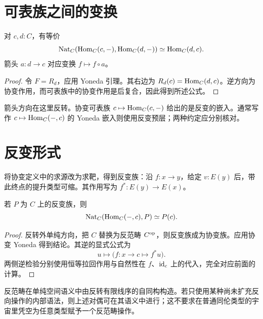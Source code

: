 \section{可表族之间的变换}
\begin{proposition}[协变可表的全忠实形式]\label{prop:covariant-yoneda-ff}
对 $c,d:C$，有等价
\[
\operatorname{Nat}_C(\operatorname{Hom}_C(c,-),\operatorname{Hom}_C(d,-))
\simeq\operatorname{Hom}_C(d,c).
\]
箭头 $a:d\to c$ 对应变换 $f\mapsto f\circ a$。
\end{proposition}
\begin{proof}
令 $F=R_d$，应用 Yoneda 引理。其右边为 $R_d(c)=\operatorname{Hom}_C(d,c)$。逆方向为协变作用，而可表族中的协变作用是后复合，因此得到所述公式。
\end{proof}
\begin{remark}
箭头方向在这里反转。协变可表族 $c\mapsto\operatorname{Hom}_C(c,-)$ 给出的是反变的嵌入。通常写作 $c\mapsto\operatorname{Hom}_C(-,c)$ 的 Yoneda 嵌入则使用反变预层；两种约定应分别核对。
\end{remark}

\section{反变形式}
\begin{definition}[反变族]
将协变定义中的求源改为求靶，得到反变族：沿 $f:x\to y$，给定 $v:E(y)$ 后，带此终点的提升类型可缩。其作用写为 $f^*:E(y)\to E(x)$。
\end{definition}
\begin{theorem}[反变 Yoneda 引理]
若 $P$ 为 $C$ 上的反变族，则
\[
\operatorname{Nat}_C(\operatorname{Hom}_C(-,c),P)\simeq P(c).
\]
\end{theorem}
\begin{proof}
反转外单纯方向，把 $C$ 替换为反范畴 $C^{\mathrm{op}}$，则反变族成为协变族。应用协变 Yoneda 得到结论。其逆的显式公式为
\[
u\longmapsto\bigl(f:x\to c\longmapsto f^*u\bigr).
\]
两侧逆检验分别使用恒等拉回作用与自然性在 $f$、$\operatorname{id}_c$ 上的代入，完全对应前面的计算。
\end{proof}
\begin{remark}
反范畴在单纯空间语义中由反转有限线序的自同构构造。若只使用某种尚未扩充反向操作的内部语法，则上述对偶可在其语义中进行；这不要求在普通同伦类型的宇宙里凭空为任意类型赋予一个反范畴操作。
\end{remark}

